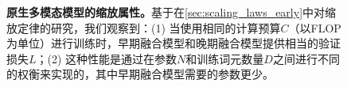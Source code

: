
\begin{figure}[t!]
    \centering
    \captionsetup{type=figure}
    \begin{subfigure}[t]{0.48\linewidth}
        
    \end{subfigure}
    \hfill
    \begin{subfigure}[t]{0.48\linewidth}
        
    \end{subfigure}
    \vspace{-3mm}
    \caption{\textbf{原生多模态模型的缩放属性。}基于在\cref{sec:scaling_laws_early}中对缩放定律的研究，我们观察到：(1) 当使用相同的计算预算$C$（以FLOP为单位）进行训练时，早期融合模型和晚期融合模型提供相当的验证损失$L$；(2) 这种性能是通过在参数$N$和训练词元数量$D$之间进行不同的权衡来实现的，其中早期融合模型需要的参数更少。
    }
    \label{fig:teaser}
\end{figure}
